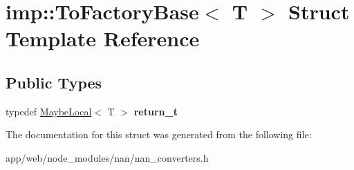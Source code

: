\hypertarget{structimp_1_1_to_factory_base}{}\section{imp\+:\+:To\+Factory\+Base$<$ T $>$ Struct Template Reference}
\label{structimp_1_1_to_factory_base}
\subsection*{Public Types}
\begin{DoxyCompactItemize}
\item 
\mbox{\label{structimp_1_1_to_factory_base_ab4bb67886d4e776cdc539d9c3d924d36}} 
typedef \hyperlink{class_maybe_local}{Maybe\+Local}$<$ T $>$ {\bfseries return\+\_\+t}
\end{DoxyCompactItemize}


The documentation for this struct was generated from the following file\+:\begin{DoxyCompactItemize}
\item 
app/web/node\+\_\+modules/nan/nan\+\_\+converters.\+h\end{DoxyCompactItemize}
